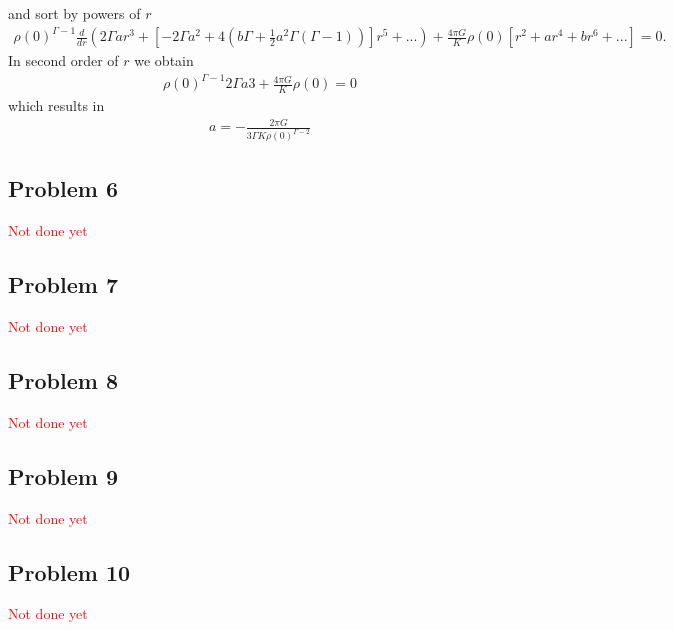 \documentclass[10pt,a4paper]{book}
\theoremstyle{definition}
\begin{document}
and sort by powers of $r$
\begin{align}
    \rho(0)^{\Gamma-1}\frac{d}{dr}\left(2\Gamma ar^3+\left[-2\Gamma a^2+4\left(b\Gamma+\frac{1}{2}a^2\Gamma(\Gamma-1)\right)\right]r^5+...\right)+\frac{4\pi G}{K}\rho(0)\left[r^2+ar^4+br^6+...\right]=0.
\end{align}
In second order of $r$ we obtain
\begin{align}
    \rho(0)^{\Gamma-1}2\Gamma a3+\frac{4\pi G}{K}\rho(0)=0
\end{align}
which results in
\begin{align}
     a=-\frac{2\pi G}{3\Gamma K\rho(0)^{\Gamma-2}}
\end{align}

\subsection{Problem 6}
\textcolor{red}{Not done yet}

\subsection{Problem 7}
\textcolor{red}{Not done yet}
\subsection{Problem 8}
\textcolor{red}{Not done yet}
\subsection{Problem 9}
\textcolor{red}{Not done yet}
\subsection{Problem 10}
\textcolor{red}{Not done yet}
\end{document}
